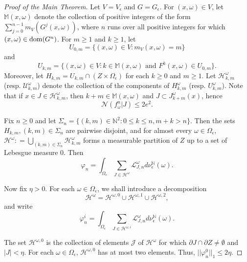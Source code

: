 \documentclass[11pt,oneside]{article}
\theoremstyle{plain}
\numberwithin{equation}{section}
\numberwithin{figure}{section}
\numberwithin{table}{section}
\begin{document}
\begin{proof}[Proof of the Main Theorem]
Let $V = V_{\epsilon}$ and $G = G_{\epsilon}$. For $(x, \omega) \in V$, let $\mathbb M(x, \omega) $ denote the collection of positive integers of the form $\sum_{j=0}^{n-1} m_V(G^j (x, \omega))$, where $n$ runs over all positive integers for which $(x, \omega) \in {\rm dom}(G^n)$. For $m \geq 1$ and $k \geq 1$, let 
\[
U_{0, m} = \{ (x, \omega) \in V : m_V(x, \omega) = m \}
\]
and 
\[
U_{k, m} = \{ (x, \omega) \in V : k \in \mathbb M(x, \omega) \mbox{ and } F^k(x, \omega) \in U_{0, m} \}.
\]
Moreover, let $H_{k, m} = U_{k, m} \cap (Z \times \Omega_{\epsilon})$ for each $k \geq 0$ and $ m \geq 1$. Let $\mathcal H_{k, m}^{\omega}$ (resp. $\mathcal U_{k, m}^{\omega}$) denote the collection of the components of $H_{k, m}^{\omega}$ (resp. $U_{k, m}^{\omega}$). Note that if $x \in J \in \mathcal H_{k, m}^{\omega}$, then $k +m \in \mathbb M(x, \omega)$ and $ J \subset J_{k+m}^{\omega} (x)$, hence
\begin{equation}
\mathcal N(f_{\omega}^n |J) \leq 2e^2.
\end{equation}

Fix $n \geq 0$ and let $\Sigma_n = \{ (k, m) \in \mathbb N^2 : 0\leq k \leq n, m+k > n \}$. Then the sets $H_{k, m}, (k, m) \in \Sigma_n$ are pairwise disjoint, and for almost every $\omega \in \Omega_{\epsilon}$, $\mathcal H^{\omega} : = \bigcup_{(k, m) \in \Sigma_n} \mathcal H_{k, m}^{\omega}$ forms a measurable partition of $Z$ up to a set of Lebesgue measure 0. Then 
\begin{equation}
\varphi_n = \int_{\Omega_{\epsilon}} \sum_{J \in \mathcal H^{\omega}} \mathcal L_{J, n}^{\omega} d \nu_{\epsilon}^{\mathbb N} (\omega). 
\end{equation}


Now fix $ \eta >0$. For each $\omega \in \Omega_{\epsilon}$, we shall introduce a decomposition
\begin{equation}
\mathcal H^{\omega} = \mathcal H^{\omega, 0} \cup \mathcal H^{\omega, 1} \cup \mathcal H^{\omega, 2},
\end{equation}
and write
\[
\varphi_n^i =  \int_{\Omega_{\epsilon}} \sum_{J \in \mathcal H^{\omega, i}} \mathcal L_{J, n}^{\omega} d \nu_{\epsilon}^{\mathbb N} (\omega).
\]


The set $\mathcal H^{\omega, 0}$ is the collection of elements $\mathcal J$ of $\mathcal H^{\omega}$ for which $\partial J \cap \partial Z \neq \emptyset$ and $|J | < \eta$. For each $\omega \in \Omega_{\epsilon}$, $\mathcal H^{\omega, 0}$ has at most two elements. Thus, $|| \varphi_n^0 ||_1 \leq 2 \eta$.



\end{proof}
\end{document}
